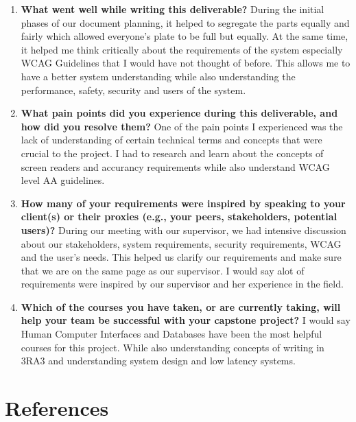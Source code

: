 \documentclass[12pt]{article}
\begin{document}
\begin{enumerate}
  \item \textbf{What went well while writing this deliverable?} \newline
   During the initial phases of our document planning, it helped to segregate the parts equally and fairly which allowed everyone's plate to be full but equally.
   At the same time, it helped me think critically about the requirements of the system especially WCAG Guidelines that I would have not thought of before. 
   This allows me to have a better system understanding while also understanding the performance, safety, security and users of the system.

  \item \textbf{What pain points did you experience during this
    deliverable, and how did you resolve them?} \newline
    One of the pain points I experienced was the lack of understanding of certain technical terms and concepts that were crucial to the project.
    I had to research and learn about the concepts of screen readers and accurancy requirements while also understand WCAG level AA guidelines.


  \item \textbf{How many of your requirements were inspired by
      speaking to your client(s) or their proxies (e.g., your peers,
    stakeholders, potential users)?} \newline
    During our meeting with our supervisor, we had intensive discussion about our stakeholders, system requirements, security requirements, WCAG and the user's needs.
    This helped us clarify our requirements and make sure that we are on the same page as our supervisor. I would say alot of requirements were inspired by our supervisor and her experience in the field.

  \item \textbf{Which of the courses you have taken, or are currently
      taking, will help your team be successful with your capstone
    project?} \newline
    I would say Human Computer Interfaces and Databases have been the most helpful courses for this project. While also understanding concepts of writing in 3RA3 and understanding system design and low latency systems.
   
\end{enumerate}

\newpage
\section*{References}
\end{document}

